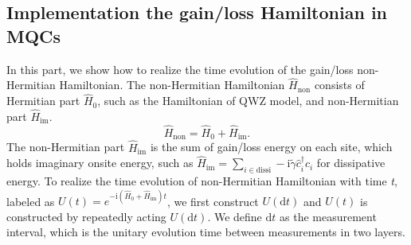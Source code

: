 \documentclass[longbibliography, aps, prx, amsmath, amssymb, amsfonts, twocolumn,superscriptaddress, footinbib]{revtex4-1}
\begin{document}
	\subsection{Implementation the gain/loss Hamiltonian in MQCs}

	In this part, we show how to realize the time evolution of the gain/loss non-Hermitian Hamiltonian. The non-Hermitian Hamiltonian $\hat{H}_{\text{non}}$ consists of Hermitian part $\hat{H}_0$, such as the Hamiltonian of QWZ model, and non-Hermitian part $\hat{H}_{\text{im}}$.
	\begin{equation}
		\hat{H}_{\text{non}} = \hat{H}_0 +\hat{H}_{\text{im}}. \label{eq:non-hermitian}
	\end{equation}
	The non-Hermitian part $\hat{H}_{\text{im}}$ is the sum of gain/loss energy on each site, which holds imaginary onsite energy, such as $\hat{H}_{\text{im}} = \sum_{i\in \text{dissi}} -\mathrm{i}\tilde{\gamma} \hat{c}_i^{\dagger} \hat{c}_i$ for dissipative energy. 
	To realize the time evolution of non-Hermitian Hamiltonian with time \textit{t}, labeled as $U(t) = e^{-\mathrm{i}(\hat{H}_0+\hat{H}_{\text{im}})t}$, we first construct $U(\mathrm{d} t)$ and  
	$U(t)$ is constructed by repeatedly acting $U(\mathrm{d} t)$.
	We define $\mathrm{d} t$ as the measurement interval, which is the unitary evolution time between measurements in two layers.
	
\end{document}
